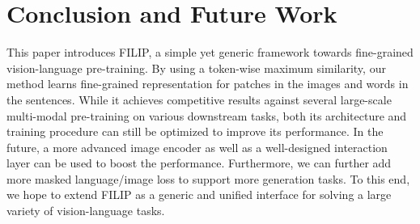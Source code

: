 \vspace{-2mm}
\section{Conclusion and Future Work}
\label{sec:conclusion}
This paper introduces FILIP, a simple yet generic framework towards fine-grained vision-language pre-training.
By using a token-wise maximum similarity, our method learns fine-grained representation for patches in the images and words in the sentences.
While it achieves competitive results against several large-scale multi-modal pre-training on various downstream tasks, both its architecture and training procedure can still be optimized to improve its performance. In the future, a
more advanced image encoder as well as a well-designed interaction layer can be used to boost the performance.
Furthermore, we can further add more masked language/image loss to support more generation tasks.
To this end, we hope to extend FILIP as a generic and unified interface for solving a large variety of vision-language tasks.

